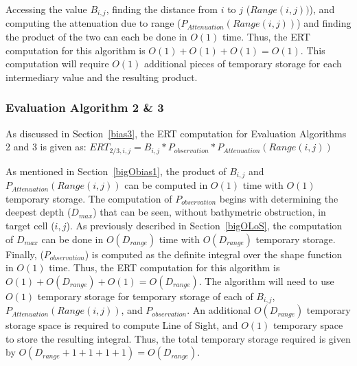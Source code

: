 Accessing the value $ B_{i,j}$, finding the distance from $i$ to $j$ ($Range(i,j))$), and computing the attenuation due to range ($P_{Attenuation}(Range(i,j))$) and finding the product of the two can each be done in $O(1)$ time.  Thus, the ERT computation for this algorithm is $O(1) + O(1) + O(1) = O(1)$.  This computation will require $O(1)$ additional pieces of temporary storage for each intermediary value and the resulting product.


\subsubsection{Evaluation Algorithm 2 \& 3}
\label{bigObias23}
As discussed in Section~\ref{bias3}, the ERT computation for Evaluation Algorithms 2 and 3 is given as:\newline
$ERT_{2/3,i,j} =  B_{i,j} * P_{observation} * P_{Attenuation}(Range(i,j))$\newline

As mentioned in Section~\ref{bigObias1}, the product of $B_{i,j}$ and $P_{Attenuation}(Range(i,j))$ can be computed in $O(1)$ time with $O(1)$ temporary storage.  The computation of $P_{observation}$ begins with determining the deepest depth ($D_{max}$) that can be seen, without bathymetric obstruction, in target cell ($i,j$).  As previously described in Section~\ref{bigOLoS}, the computation of $D_{max}$ can be done in $O(D_{range})$ time with $O(D_{range})$ temporary storage.  Finally, ($P_{observation}$) is computed as the definite integral over the shape function in $O(1)$ time.  Thus, the ERT computation for this algorithm is $O(1) + O(D_{range}) + O(1) = O(D_{range})$.  The algorithm will need to use $O(1)$ temporary storage for temporary storage of each of $B_{i,j}$, $P_{Attenuation}(Range(i,j))$, and $P_{observation}$.  An additional $O(D_{range})$ temporary storage space is required to compute Line of Sight, and $O(1)$ temporary space to store the resulting integral.  Thus, the total temporary storage required is given by $O(D_{range}+1+1+1+1)=O(D_{range})$.


